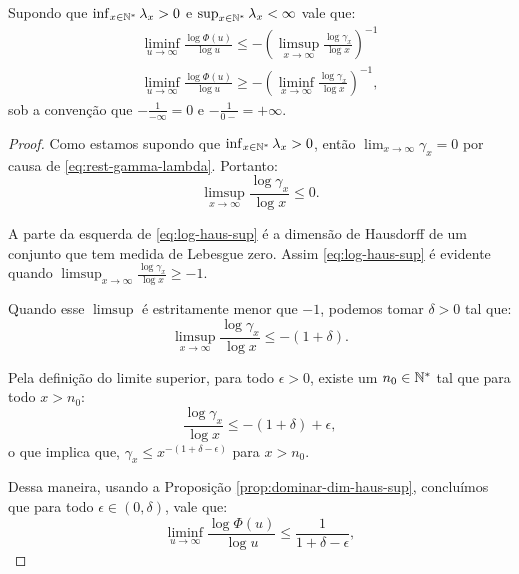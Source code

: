 \begin{corolario}
  \label{cor:log-haus}
  Supondo que $\inf_{x \in {\mathbb{N^*}}} \lambda_x > 0$ e $\sup_{x \in {\mathbb{N^*}}}
  \lambda_x < \infty$  vale que:
  \begin{gather}
    \label{eq:log-haus-sup}
    \liminf_{u \to \infty} \frac{\log \Phi(u)}{\log u} \leq
    - \left( \limsup_{x \to \infty} \frac{\log \gamma_x}{\log x}
    \right)^{-1} \\
    \label{eq:log-haus-inf}
    \liminf_{u \to \infty} \frac{\log \Phi(u)}{\log u} \geq
    - \left( \liminf_{x \to \infty} \frac{\log \gamma_x}{\log x}
    \right)^{-1},
  \end{gather}
  sob a convenção que $-\frac{1}{-\infty} = 0$ e $-\frac{1}{0-} =
  +\infty$.
\end{corolario}
\begin{proof}
  Como estamos supondo que $\inf_{x \in {\mathbb{N^*}}} \lambda_x > 0$, então
  $\lim_{x \to \infty} \gamma_x = 0$ por causa de
  \eqref{eq:rest-gamma-lambda}.  Portanto:
  \begin{displaymath}
    \limsup_{x\to\infty}\frac{\log \gamma_x}{\log x} \leq 0.
  \end{displaymath}
  
  A parte da esquerda de \eqref{eq:log-haus-sup} é a dimensão de
  Hausdorff de um conjunto que tem medida de Lebesgue zero. Assim
  \eqref{eq:log-haus-sup} é evidente quando
  $\limsup_{x\to\infty}\frac{\log \gamma_x}{\log x} \geq -1$.


  Quando esse $\limsup$ é estritamente menor que $-1$,
  podemos tomar $\delta > 0$ tal que:
  \begin{equation}
    \label{eq:log-haus-delta}
    \limsup_{x \to \infty} \frac{\log \gamma_x}{\log x} \leq -(1
    + \delta).
  \end{equation}
  
  Pela definição do limite superior, para todo $\epsilon > 0$, existe
  um $n_0 \in {\mathbb{N^*}}$ tal que para todo $x > n_0$:
  \begin{displaymath}
    \frac{\log \gamma_x}{\log x} \leq -(1+\delta) + \epsilon,
  \end{displaymath}
  o que implica que, $ \gamma_x \leq x^{-(1+\delta-\epsilon)}$ para $x
  > n_0$.

  Dessa maneira, usando a Proposição \ref{prop:dominar-dim-haus-sup},
  concluímos que para todo $\epsilon \in (0, \delta)$, vale que:
  \begin{displaymath}
    \liminf_{u \to \infty} \frac{\log \Phi(u)}{\log u} \leq
    \frac{1}{1+\delta-\epsilon},
  \end{displaymath}
  

\end{proof}
